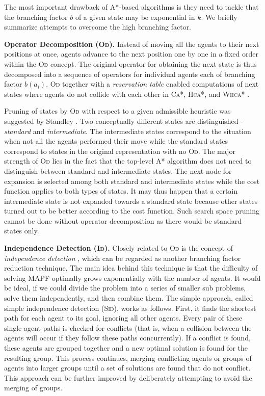 \documentclass[jair,oneside,11pt]{article}
\begin{document}
The most important drawback of A*-based algorithms is they need to tackle that the branching factor
$b$ of a given state may be exponential in $k$. We briefly summarize attempts to overcome the high branching factor.

{\bf Operator Decomposition (\textsc{Od}).} Instead of moving all the agents to their next positions
at once, agents advance to the next position one by one in a fixed order within the \textsc{Od} concept. The
original operator for obtaining the next state is thus decomposed into a sequence of operators for individual agents each of branching factor $b(a_i)$. \textsc{Od} together with a {\em reservation table} enabled computations of next states where agents do not collide with each other in \textsc{Ca*}, \textsc{Hca*}, and \textsc{Whca*} \cite{DBLP:conf/aiide/Silver05}.

Pruning of states by \textsc{Od} with respect to a given admissible heuristic was suggested by Standley \citeyear{DBLP:conf/aaai/Standley10}. Two conceptually different states are distinguished - {\em standard} and {\em intermediate}. The intermediate states correspond to the situation when not all the agents performed their move while the standard states correspond to states in the original representation with no \textsc{Od}.
The major strength of \textsc{Od} lies in the fact that the top-level A* algorithm does not need to distinguish
between standard and intermediate states. The next node for expansion is selected among both standard
and intermediate states while the cost function applies to both types of states. It may thus happen
that a certain intermediate state is not expanded towards a standard state because other states turned out
to be better according to the cost function. Such search space pruning cannot be done without
operator decomposition as there would be standard states only.

{\bf Independence Detection (\textsc{Id}).} Closely related to \textsc{Od} is the concept of {\em independence detection} \cite{DBLP:conf/aaai/Standley10}, which can be regarded as another branching factor reduction technique. The main idea behind this technique is that the difficulty of solving MAPF optimally grows exponentially with the number of agents. It would be ideal, if we could divide the problem into a series of smaller sub problems, solve them independently, and then combine them.
The simple approach, called simple independence detection (\textsc{Sid}), works as follows. First, it finds the shortest path for each agent to its goal, ignoring all other agents. 
Every pair of these single-agent paths is checked for conflicts (that is, when a collision between the agents will occur if they follow these paths concurrently). If a conflict is found, these agents are grouped together and a new optimal solution is found for the resulting group. This process continues, merging conflicting agents or groups of agents into larger groups until a set of solutions are found that do not conflict. This approach can be further improved by deliberately attempting to avoid the merging of groups.
\end{document}
